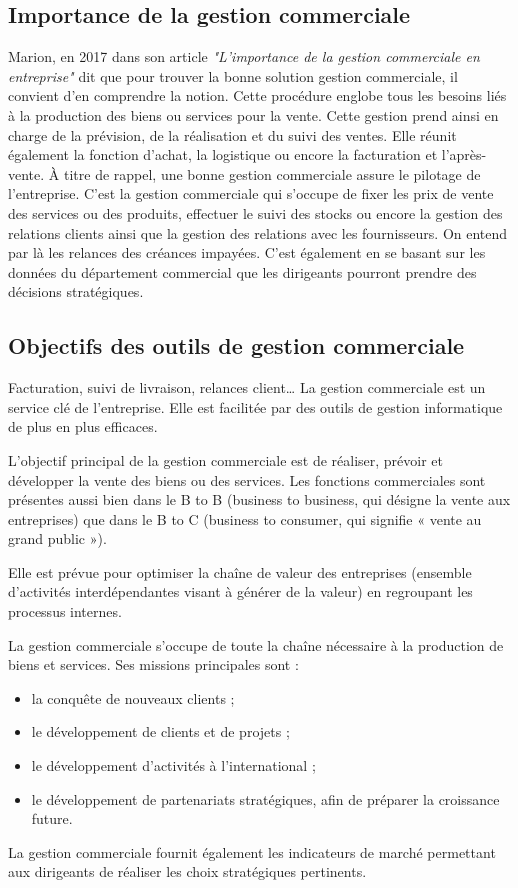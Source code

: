 \subsection{Importance de la gestion commerciale}
Marion, en 2017 \cite{WEBSITE:3} dans son article \textit{"L’importance de la gestion commerciale en entreprise"} dit que pour trouver la bonne solution gestion commerciale, il convient d’en comprendre la notion. Cette procédure englobe tous les besoins liés à la production des biens ou services pour la vente. Cette gestion prend ainsi en charge de la prévision, de la réalisation et du suivi des ventes. Elle réunit également la fonction d’achat, la logistique ou encore la facturation et l’après-vente. À titre de rappel, une bonne gestion commerciale assure le pilotage de l’entreprise. C’est la gestion commerciale qui s’occupe de fixer les prix de vente des services ou des produits, effectuer le suivi des stocks ou encore la gestion des relations clients ainsi que la gestion des relations avec les fournisseurs. On entend par là les relances des créances impayées. C’est également en se basant sur les données du département commercial que les dirigeants pourront prendre des décisions stratégiques. 

\subsection{Objectifs des outils de gestion commerciale}
Facturation, suivi de livraison, relances client… La gestion commerciale est un service clé de l’entreprise. Elle est facilitée par des outils de gestion informatique de plus en plus efficaces.

L'objectif principal de la gestion commerciale est de réaliser, prévoir et développer la vente des biens ou des services. Les fonctions commerciales sont présentes aussi bien dans le B to B (business to business, qui désigne la vente aux entreprises) que dans le B to C (business to consumer, qui signifie « vente au grand public »).

Elle est prévue pour optimiser la chaîne de valeur des entreprises (ensemble d'activités interdépendantes visant à générer de la valeur) en regroupant les processus internes.

La gestion commerciale s’occupe de toute la chaîne nécessaire à la production de biens et services. Ses missions principales sont :
\begin{itemize}
    \item la conquête de nouveaux clients ;
    \item le développement de clients et de projets ;
    \item le développement d’activités à l’international ;
    \item le développement de partenariats stratégiques, afin de préparer la croissance future.
\end{itemize}
La gestion commerciale fournit également les indicateurs de marché permettant aux dirigeants de réaliser les choix stratégiques pertinents.


